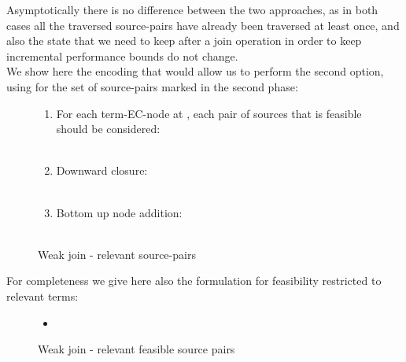 Asymptotically there is no difference between the two approaches, as in both cases all the traversed source-pairs have already been traversed at least once, and also the state that we need to keep after a join operation in order to keep incremental performance bounds do not change.\\
We show here the encoding that would allow us to perform the second option, using  for the set of source-pairs marked in the second phase:
\begin{figure}[H]
\begin{enumerate}
	\item For each term-EC-node at , each pair of sources that is feasible should be considered:\\
	\\
	\item Downward closure:\\
	\\
	\item Bottom up node  addition:\\
	\\
\end{enumerate}
\caption{Weak join - relevant source-pairs}
\label{wj_relevant_source_pairs}
\end{figure}
For completeness we give here also the formulation for feasibility restricted to relevant terms:
\begin{figure}[H]
\begin{itemize}
	\item {}\\
\end{itemize}
\caption{Weak join - relevant feasible source pairs}
\label{wj_relevant_feasible_source_pairs}
\end{figure}

